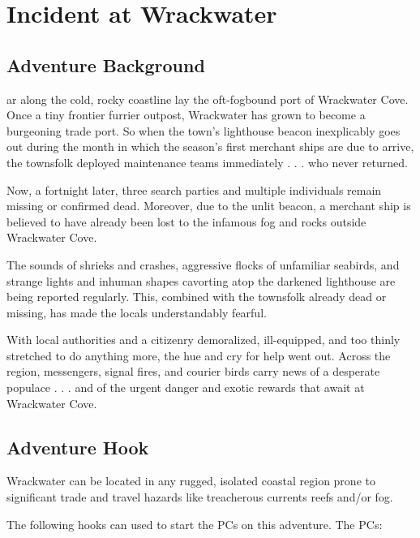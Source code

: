 \documentclass[10pt,a4paper,twoside,bg=print,twocolumn,openany,nodeprecatedcode]{dndbook}
\begin{document}
\chapter{Incident at Wrackwater}

\begin{DndTable}{c}

\textbf{An adventure for four to five characters of 5th level says 6th level.} characters}\\
\end{DndTable}

\section{Adventure Background}
ar along the cold, rocky coastline lay the oft-fogbound port of Wrackwater Cove. Once a tiny frontier furrier outpost, Wrackwater has grown to become a burgeoning trade port. So when the town's lighthouse beacon inexplicably goes out during the month in which the season's first merchant ships are due to arrive, the townsfolk deployed maintenance teams immediately . . . who never returned.


Now, a fortnight later, three search parties and multiple individuals remain missing or confirmed dead. Moreover, due to the unlit beacon, a merchant ship is believed to have already been lost to the infamous fog and rocks outside Wrackwater Cove.

The sounds of shrieks and crashes, aggressive flocks of unfamiliar seabirds, and strange lights and inhuman shapes cavorting atop the darkened lighthouse are being reported regularly. This, combined with the townsfolk already dead or missing, has made the locals understandably fearful.

With local authorities and a citizenry demoralized, ill-equipped, and too thinly stretched to do anything more, the hue and cry for help went out. Across the region, messengers, signal fires, and courier birds carry news of a desperate populace . . . and of the urgent danger and exotic rewards that await at Wrackwater Cove.

\section{Adventure Hook}
Wrackwater can be located in any rugged, isolated coastal region prone to significant trade and travel hazards like treacherous currents reefs and/or fog.

The following hooks can used to start the PCs on this adventure. The PCs:
\end{document}
